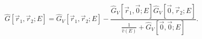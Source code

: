 \begin{equation}
\label{fixed-e1}
\hat{G}[\vec{r}_1, \vec{r}_2; E] = \hat{G}_V[\vec{r}_1, \vec{r}_2; E]
- \frac{\hat{G}_V[\vec{r}_1, \vec{0}; E] \hat{G}_V[\vec{0}, \vec{r}_2; E]}
       {\frac{1}{\hat{v}(E)} + \hat{G}_V[\vec{0}, \vec{0}; E]}.
\end{equation}

